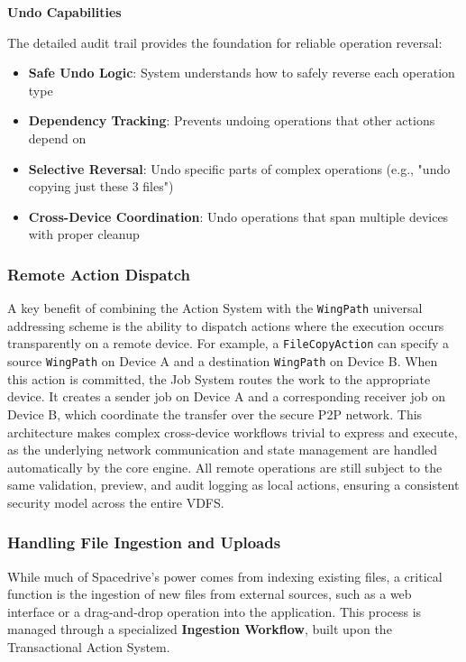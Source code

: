 \documentclass[sigconf]{acmart}
\newcommand{\plannedSection}[1]{#1}
\begin{document}
\textbf{\plannedSection{Undo Capabilities}}

The detailed audit trail provides the foundation for reliable operation reversal:

\begin{itemize}[noitemsep, topsep=0pt]
 \item \textbf{Safe Undo Logic}: System understands how to safely reverse each operation type
 \item \textbf{Dependency Tracking}: Prevents undoing operations that other actions depend on
 \item \textbf{Selective Reversal}: Undo specific parts of complex operations (e.g., "undo copying just these 3 files")
 \item \textbf{Cross-Device Coordination}: Undo operations that span multiple devices with proper cleanup
\end{itemize}

\subsubsection{Remote Action Dispatch}

A key benefit of combining the Action System with the \texttt{WingPath} universal addressing scheme is the ability to dispatch actions where the execution occurs transparently on a remote device. For example, a \texttt{FileCopyAction} can specify a source \texttt{WingPath} on Device A and a destination \texttt{WingPath} on Device B. When this action is committed, the Job System routes the work to the appropriate device. It creates a sender job on Device A and a corresponding receiver job on Device B, which coordinate the transfer over the secure P2P network. This architecture makes complex cross-device workflows trivial to express and execute, as the underlying network communication and state management are handled automatically by the core engine. All remote operations are still subject to the same validation, preview, and audit logging as local actions, ensuring a consistent security model across the entire VDFS.

\subsubsection{Handling File Ingestion and Uploads}
\label{sec:ingestion-workflow}
While much of Spacedrive's power comes from indexing existing files, a critical function is the ingestion of new files from external sources, such as a web interface or a drag-and-drop operation into the application. This process is managed through a specialized \textbf{Ingestion Workflow}, built upon the Transactional Action System.
\end{document}
